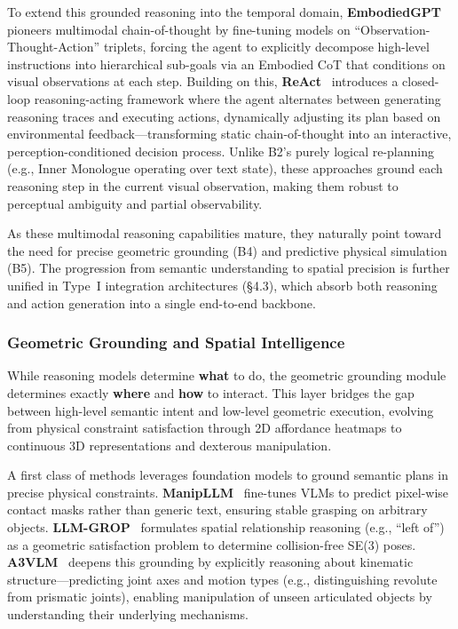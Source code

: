 \documentclass[acmsmall,screen,review,anonymous]{acmart}
\begin{document}
To extend this grounded reasoning into the temporal domain, \textbf{EmbodiedGPT}~\cite{mu2023embodiedgpt} pioneers multimodal chain-of-thought by fine-tuning models on ``Observation-Thought-Action'' triplets, forcing the agent to explicitly decompose high-level instructions into hierarchical sub-goals via an Embodied CoT that conditions on visual observations at each step. Building on this, \textbf{ReAct}~\cite{yao2023react} introduces a closed-loop reasoning-acting framework where the agent alternates between generating reasoning traces and executing actions, dynamically adjusting its plan based on environmental feedback---transforming static chain-of-thought into an interactive, perception-conditioned decision process. Unlike B2's purely logical re-planning (e.g., Inner Monologue operating over text state), these approaches ground each reasoning step in the current visual observation, making them robust to perceptual ambiguity and partial observability.

As these multimodal reasoning capabilities mature, they naturally point toward the need for precise geometric grounding (B4) and predictive physical simulation (B5). The progression from semantic understanding to spatial precision is further unified in Type~I integration architectures (\S4.3), which absorb both reasoning and action generation into a single end-to-end backbone.

\subsubsection{Geometric Grounding and Spatial Intelligence}\label{sec:affordance_mapping}

While reasoning models determine \textbf{what} to do, the geometric grounding module determines exactly \textbf{where} and \textbf{how} to interact. This layer bridges the gap between high-level semantic intent and low-level geometric execution, evolving from physical constraint satisfaction through 2D affordance heatmaps to continuous 3D representations and dexterous manipulation.

A first class of methods leverages foundation models to ground semantic plans in precise physical constraints. \textbf{ManipLLM}~\cite{manipllm2024} fine-tunes VLMs to predict pixel-wise contact masks rather than generic text, ensuring stable grasping on arbitrary objects. \textbf{LLM-GROP}~\cite{llmgrop2024} formulates spatial relationship reasoning (e.g., ``left of'') as a geometric satisfaction problem to determine collision-free SE(3) poses. \textbf{A3VLM}~\cite{huang2024a3vlm} deepens this grounding by explicitly reasoning about kinematic structure---predicting joint axes and motion types (e.g., distinguishing revolute from prismatic joints), enabling manipulation of unseen articulated objects by understanding their underlying mechanisms.
\end{document}

